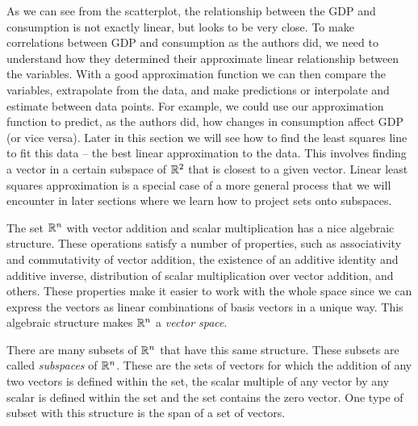 As we can see from the scatterplot, the relationship between the GDP and consumption is not exactly linear, but looks to be very close. To make correlations between GDP and consumption as the authors did, we need to understand how they determined their approximate linear relationship between the variables.  With a good approximation function we can then compare the variables, extrapolate from the data, and make predictions or interpolate and estimate between data points. For example, we could use our approximation function to predict, as the authors did, how changes in consumption affect GDP (or vice versa). Later in this section we will see how to find the least squares line to fit this data -- the best linear approximation to the data. This involves finding a vector in a certain subspace of $\mathbb{R}^2$ that is closest to a given vector. Linear least squares approximation is a special case of a more general process that we will encounter in later sections where we learn how to project sets onto subspaces. 



The set $\mathbb{R}^n$ with vector addition and scalar multiplication has a nice algebraic structure. These operations satisfy a number of properties, such as associativity and commutativity of vector addition, the existence of an additive identity and additive inverse, distribution of scalar multiplication over vector addition, and others. These properties make it easier to work with the whole space since we can express the vectors as linear combinations of basis vectors in a unique way. This algebraic structure makes $\mathbb{R}^n$ a \emph{vector space}. 

There are many subsets of $\mathbb{R}^n$ that have this same structure. These subsets are called \emph{subspaces} of $\mathbb{R}^n$. These are the sets of vectors for which the addition of any two vectors is defined within the set, the scalar multiple of any vector by any scalar is defined within the set and the set contains the zero vector. One type of subset with this structure is the span of a set of vectors. 
 
